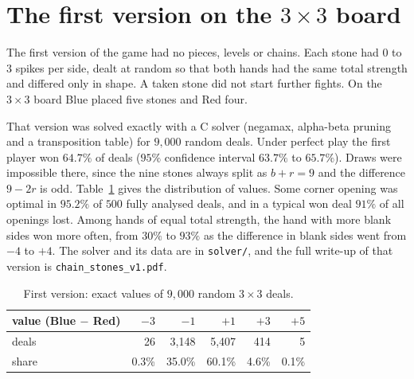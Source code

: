 \documentclass[11pt,a4paper]{article}
\begin{document}
\appendix
\section{The first version on the $3\times3$ board}

The first version of the game had no pieces, levels or chains. Each stone had $0$ to $3$ spikes per side, dealt at random so that both hands had the same total strength and differed only in shape. A taken stone did not start further fights. On the $3\times3$ board Blue placed five stones and Red four.

That version was solved exactly with a C solver (negamax, alpha-beta pruning and a transposition table) for $9{,}000$ random deals. Under perfect play the first player won $64.7\%$ of deals ($95\%$ confidence interval $63.7\%$ to $65.7\%$). Draws were impossible there, since the nine stones always split as $b+r=9$ and the difference $9-2r$ is odd. Table~\ref{tab:values} gives the distribution of values. Some corner opening was optimal in $95.2\%$ of $500$ fully analysed deals, and in a typical won deal $91\%$ of all openings lost. Among hands of equal total strength, the hand with more blank sides won more often, from $30\%$ to $93\%$ as the difference in blank sides went from $-4$ to $+4$. The solver and its data are in \texttt{solver/}, and the full write-up of that version is \texttt{chain\_stones\_v1.pdf}.

\begin{table}[ht]
\centering
\begin{tabular}{lrrrrr}
\toprule
value (Blue $-$ Red) & $-3$ & $-1$ & $+1$ & $+3$ & $+5$ \\
\midrule
deals & 26 & 3{,}148 & 5{,}407 & 414 & 5 \\
share & 0.3\% & 35.0\% & 60.1\% & 4.6\% & 0.1\% \\
\bottomrule
\end{tabular}
\caption{First version: exact values of $9{,}000$ random $3\times3$ deals.}
\label{tab:values}
\end{table}
\end{document}
